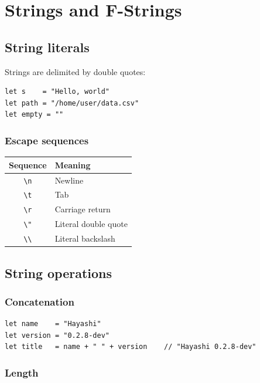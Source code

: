 \chapter{Strings and F-Strings}

\section{String literals}

Strings are delimited by double quotes:

\begin{lstlisting}
let s    = "Hello, world"
let path = "/home/user/data.csv"
let empty = ""
\end{lstlisting}

\subsection*{Escape sequences}

\begin{center}
\begin{tabular}{cl}
\toprule
\textbf{Sequence} & \textbf{Meaning} \\
\midrule
\texttt{\textbackslash n}  & Newline \\
\texttt{\textbackslash t}  & Tab \\
\texttt{\textbackslash r}  & Carriage return \\
\texttt{\textbackslash"}   & Literal double quote \\
\texttt{\textbackslash\textbackslash} & Literal backslash \\
\bottomrule
\end{tabular}
\end{center}

\section{String operations}

\subsection*{Concatenation}

\begin{lstlisting}
let name    = "Hayashi"
let version = "0.2.8-dev"
let title   = name + " " + version    // "Hayashi 0.2.8-dev"
\end{lstlisting}

\subsection*{Length}

